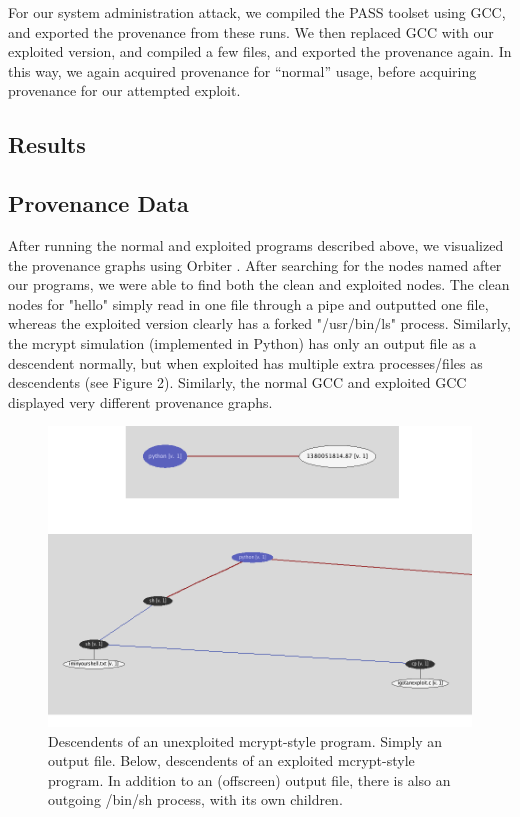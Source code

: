 \documentclass[10pt,twocolumn]{article}
\begin{document}
For our system administration attack, we compiled the PASS toolset using GCC, and exported the provenance from these runs. We then replaced GCC with our exploited version, and compiled a few files, and exported the provenance again. In this way, we again acquired provenance for “normal” usage, before acquiring provenance for our attempted exploit. 


\subsection{Results}
\subsection{Provenance Data}
After running the normal and exploited programs described above, we visualized the provenance graphs using Orbiter \cite{orbiter}. After searching for the nodes named after our programs, we were able to find both the clean and exploited nodes. The clean nodes for "hello" simply read in one file through a pipe and outputted one file, whereas the exploited version clearly has a forked "/usr/bin/ls" process. Similarly, the mcrypt simulation (implemented in Python) has only an output file as a descendent normally, but when exploited has multiple extra processes/files as descendents (see Figure 2). Similarly, the normal GCC and exploited GCC displayed very different provenance graphs. 
\begin{figure}
  \caption{Descendents of an unexploited mcrypt-style program. Simply an output file. Below, descendents of an exploited mcrypt-style program. In addition to an (offscreen) output file, there is also an outgoing /bin/sh process, with its own children.}
  \centering
    \includegraphics[width=\textwidth]{img/mcrypt.png}
\end{figure}
\end{document}
